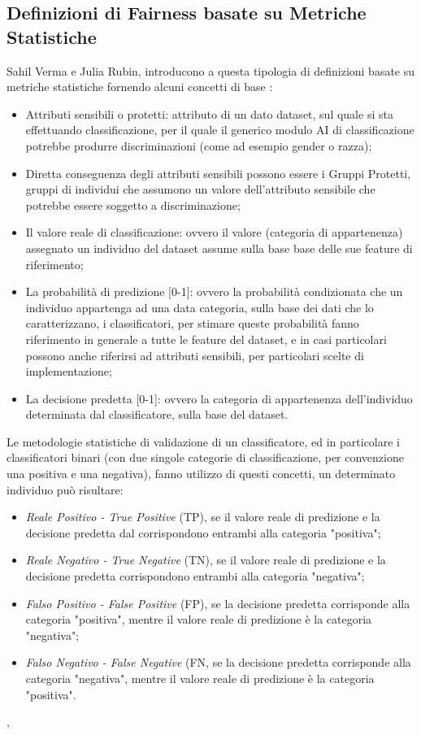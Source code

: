  \subsection{Definizioni di Fairness basate su Metriche Statistiche}
  Sahil Verma e Julia Rubin, introducono a questa tipologia di definizioni basate su metriche statistiche fornendo alcuni concetti di base \cite{FairnessDefinitionExplained}: 
 \begin{itemize}
     \item Attributi sensibili o protetti: attributo di un dato dataset, sul quale si sta effettuando classificazione, per il quale il generico modulo AI di classificazione potrebbe produrre discriminazioni (come ad esempio gender o razza);
     \item Diretta conseguenza degli attributi sensibili possono essere i Gruppi Protetti, gruppi di individui che assumono un valore dell'attributo sensibile che potrebbe essere soggetto a discriminazione;
     \item Il valore reale di classificazione: ovvero il valore (categoria di appartenenza) assegnato un individuo del dataset assume sulla base base delle sue feature di riferimento;
     \item La probabilità di predizione [0-1]: ovvero la probabilità condizionata che un individuo appartenga ad una data categoria, sulla base dei dati che lo caratterizzano, i classificatori, per stimare queste probabilità fanno riferimento in generale a tutte le feature del dataset, e in casi particolari possono anche riferirsi ad attributi sensibili, per particolari scelte di implementazione;
     \item La decisione predetta [0-1]: ovvero la categoria di appartenenza dell'individuo determinata dal classificatore, sulla base del dataset.
 \end{itemize}
 
 Le metodologie statistiche di validazione di un classificatore, ed in particolare i classificatori binari (con due singole categorie di classificazione, per convenzione una positiva e una negativa), fanno utilizzo di questi concetti, un determinato individuo può risultare:
 
 \begin{itemize}
     \item \emph{Reale Positivo - True Positive} (TP), se il valore reale di predizione e la decisione predetta dal corrispondono entrambi alla categoria "positiva";
     \item \emph{Reale Negativo - True Negative} (TN), se il valore reale di predizione e la decisione predetta corrispondono entrambi alla categoria "negativa";
     \item \emph{Falso Positivo - False Positive} (FP), se la decisione predetta corrisponde alla categoria "positiva", mentre il valore reale di predizione è la categoria "negativa";
    \item \emph{Falso Negativo - False Negative} (FN, se la decisione predetta corrisponde alla categoria "negativa", mentre il valore reale di predizione è la categoria "positiva".
 \end{itemize}, 
 
